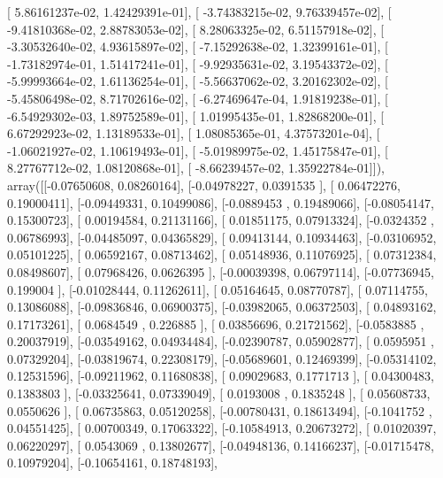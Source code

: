 \documentclass{article}
\begin{document}
       [  5.86161237e-02,   1.42429391e-01],
       [ -3.74383215e-02,   9.76339457e-02],
       [ -9.41810368e-02,   2.88783053e-02],
       [  8.28063325e-02,   6.51157918e-02],
       [ -3.30532640e-02,   4.93615897e-02],
       [ -7.15292638e-02,   1.32399161e-01],
       [ -1.73182974e-01,   1.51417241e-01],
       [ -9.92935631e-02,   3.19543372e-02],
       [ -5.99993664e-02,   1.61136254e-01],
       [ -5.56637062e-02,   3.20162302e-02],
       [ -5.45806498e-02,   8.71702616e-02],
       [ -6.27469647e-04,   1.91819238e-01],
       [ -6.54929302e-03,   1.89752589e-01],
       [  1.01995435e-01,   1.82868200e-01],
       [  6.67292923e-02,   1.13189533e-01],
       [  1.08085365e-01,   4.37573201e-04],
       [ -1.06021927e-02,   1.10619493e-01],
       [ -5.01989975e-02,   1.45175847e-01],
       [  8.27767712e-02,   1.08120868e-01],
       [ -8.66239457e-02,   1.35922784e-01]]), array([[-0.07650608,  0.08260164],
       [-0.04978227,  0.0391535 ],
       [ 0.06472276,  0.19000411],
       [-0.09449331,  0.10499086],
       [-0.0889453 ,  0.19489066],
       [-0.08054147,  0.15300723],
       [ 0.00194584,  0.21131166],
       [ 0.01851175,  0.07913324],
       [-0.0324352 ,  0.06786993],
       [-0.04485097,  0.04365829],
       [ 0.09413144,  0.10934463],
       [-0.03106952,  0.05101225],
       [ 0.06592167,  0.08713462],
       [ 0.05148936,  0.11076925],
       [ 0.07312384,  0.08498607],
       [ 0.07968426,  0.0626395 ],
       [-0.00039398,  0.06797114],
       [-0.07736945,  0.199004  ],
       [-0.01028444,  0.11262611],
       [ 0.05164645,  0.08770787],
       [ 0.07114755,  0.13086088],
       [-0.09836846,  0.06900375],
       [-0.03982065,  0.06372503],
       [ 0.04893162,  0.17173261],
       [ 0.0684549 ,  0.226885  ],
       [ 0.03856696,  0.21721562],
       [-0.0583885 ,  0.20037919],
       [-0.03549162,  0.04934484],
       [-0.02390787,  0.05902877],
       [ 0.0595951 ,  0.07329204],
       [-0.03819674,  0.22308179],
       [-0.05689601,  0.12469399],
       [-0.05314102,  0.12531596],
       [-0.09211962,  0.11680838],
       [ 0.09029683,  0.1771713 ],
       [ 0.04300483,  0.1383803 ],
       [-0.03325641,  0.07339049],
       [ 0.0193008 ,  0.1835248 ],
       [ 0.05608733,  0.0550626 ],
       [ 0.06735863,  0.05120258],
       [-0.00780431,  0.18613494],
       [-0.1041752 ,  0.04551425],
       [ 0.00700349,  0.17063322],
       [-0.10584913,  0.20673272],
       [ 0.01020397,  0.06220297],
       [ 0.0543069 ,  0.13802677],
       [-0.04948136,  0.14166237],
       [-0.01715478,  0.10979204],
       [-0.10654161,  0.18748193],
\end{document}
